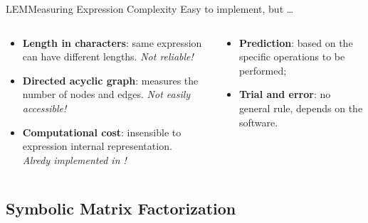 \begin{frame}{\acl{LEM}}{Measuring Expression Complexity}
  Easy to implement, but \dots
  \vspace{1.5em}
  \begin{columns}
    \begin{column}[t]{0.5\textwidth}
      \begin{itemize}
        \normalsize
        \item \textbf{Length in characters}: same expression can have different lengths.
        \emph{Not reliable!}
        \item \textbf{Directed acyclic graph}: measures the number of nodes and edges.
        \emph{Not easily accessible!}
        \item \textbf{Computational cost}: insensible to expression internal representation. \\[0.25em]
        \emph{Alredy implemented in \Maple{}!}
      \end{itemize}
    \end{column}
    \begin{column}[t]{0.5\textwidth}
      \begin{itemize}
        \normalsize
        \item \textbf{Prediction}: based on the specific operations to be performed;
        \item \textbf{Trial and error}: no general rule, depends on the software.
      \end{itemize}
    \end{column}
  \end{columns}
\end{frame}

\subsection{Symbolic Matrix Factorization}

